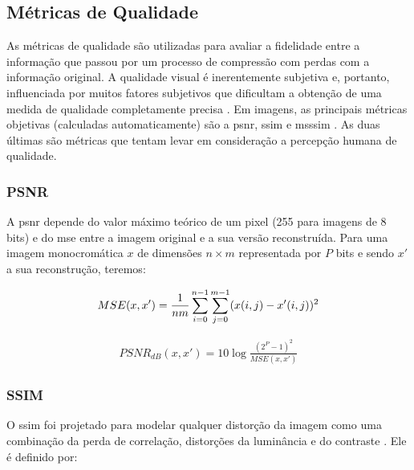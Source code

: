 \subsection{Métricas de Qualidade} 

As métricas de qualidade são utilizadas para avaliar a fidelidade entre a informação que passou por um processo de compressão com perdas com a informação original.  A qualidade visual é inerentemente subjetiva e, portanto, influenciada por muitos fatores subjetivos que dificultam a obtenção de uma medida de qualidade completamente precisa \cite{richardson2010h}.  Em imagens, as principais métricas objetivas (calculadas automaticamente) são a \gls{psnr}, \gls{ssim} e \gls{msssim} \cite{richardson2010h}. As duas últimas são métricas que tentam levar em consideração a percepção humana de qualidade. 


\subsubsection{PSNR}

A \acrshort{psnr} depende do valor máximo teórico de um pixel (255 para imagens de 8 bits) e do \gls{mse} entre a imagem original e a sua versão reconstruída. Para uma imagem monocromática $x$ de dimensões $n \times m$ representada por $P$ bits e sendo $x'$ a sua reconstrução, teremos:

\begin{equation}
\begin{aligned}
\centering    
MSE(x,x') = \displaystyle\frac{1}{nm}\sum_{i=0}^{n-1} \sum_{j=0}^{m-1} (x(i,j) - x'(i,j))^2
\end{aligned}
\end{equation} 

\begin{equation}
\begin{aligned}
PSNR_{dB}(x,x') = 10 \log\frac{(2^{P} - 1)^{2}}{MSE(x,x')} 
\end{aligned}
\end{equation}


\subsubsection{SSIM}
O \acrshort{ssim} foi projetado para modelar qualquer distorção da imagem como uma combinação da perda de correlação, distorções da luminância e do contraste \cite{hore2010image}. Ele é definido por:

